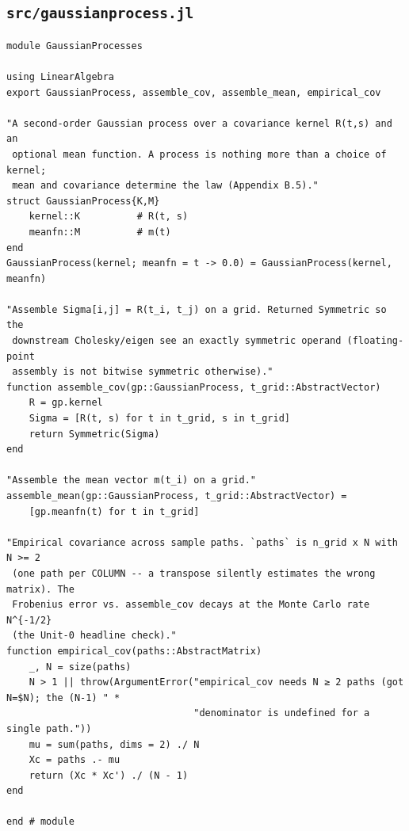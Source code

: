 \documentclass[11pt]{article}
\begin{document}
\subsection*{\texttt{src/gaussianprocess.jl}}
\begin{lstlisting}
module GaussianProcesses

using LinearAlgebra
export GaussianProcess, assemble_cov, assemble_mean, empirical_cov

"A second-order Gaussian process over a covariance kernel R(t,s) and an
 optional mean function. A process is nothing more than a choice of kernel;
 mean and covariance determine the law (Appendix B.5)."
struct GaussianProcess{K,M}
    kernel::K          # R(t, s)
    meanfn::M          # m(t)
end
GaussianProcess(kernel; meanfn = t -> 0.0) = GaussianProcess(kernel, meanfn)

"Assemble Sigma[i,j] = R(t_i, t_j) on a grid. Returned Symmetric so the
 downstream Cholesky/eigen see an exactly symmetric operand (floating-point
 assembly is not bitwise symmetric otherwise)."
function assemble_cov(gp::GaussianProcess, t_grid::AbstractVector)
    R = gp.kernel
    Sigma = [R(t, s) for t in t_grid, s in t_grid]
    return Symmetric(Sigma)
end

"Assemble the mean vector m(t_i) on a grid."
assemble_mean(gp::GaussianProcess, t_grid::AbstractVector) =
    [gp.meanfn(t) for t in t_grid]

"Empirical covariance across sample paths. `paths` is n_grid x N with N >= 2
 (one path per COLUMN -- a transpose silently estimates the wrong matrix). The
 Frobenius error vs. assemble_cov decays at the Monte Carlo rate N^{-1/2}
 (the Unit-0 headline check)."
function empirical_cov(paths::AbstractMatrix)
    _, N = size(paths)
    N > 1 || throw(ArgumentError("empirical_cov needs N ≥ 2 paths (got N=$N); the (N-1) " *
                                 "denominator is undefined for a single path."))
    mu = sum(paths, dims = 2) ./ N
    Xc = paths .- mu
    return (Xc * Xc') ./ (N - 1)
end

end # module
\end{lstlisting}
\end{document}
